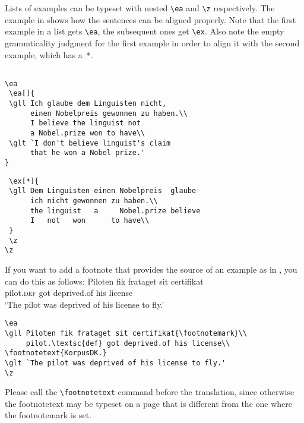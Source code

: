 Lists of examples can be typeset with nested \verb+\ea+  and \verb+\z+  respectively. The example in
 shows how the sentences can be aligned properly. Note that the first example in a list gets \verb+\ea+, the subsequent ones get \verb+\ex+. Also note the empty grammticality judgment for the first example in order to align it with the second example, which has a~*.


\ea  \label{ex:showcases:list}
\z
\z  

\begin{verbatim}

\ea 
 \ea[]{
 \gll Ich glaube dem Linguisten nicht, 
      einen Nobelpreis gewonnen zu haben.\\
      I believe the linguist not 
      a Nobel.prize won to have\\
 \glt `I don't believe linguist's claim 
      that he won a Nobel prize.'
}
\end{verbatim}
\newpage
\begin{verbatim}
 \ex[*]{
 \gll Dem Linguisten einen Nobelpreis  glaube  
      ich nicht gewonnen zu haben.\\
      the linguist   a     Nobel.prize believe 
      I   not   won      to have\\
 }
 \z
\z
\end{verbatim}

If you want to add a footnote that provides the source of an example as in , you can do
this as follows:
\ea\label{ex:showcases:footnote}
\gll Piloten         fik frataget    sit certifikat\footnotemark\\
     pilot.\textsc{def} got deprived.of his license\\
\glt `The pilot was deprived of his license to fly.'
\z 
\begin{verbatim}
\ea
\gll Piloten fik frataget sit certifikat{\footnotemark}\\
     pilot.\textsc{def} got deprived.of his license\\
\footnotetext{KorpusDK.}
\glt `The pilot was deprived of his license to fly.'
\z 
\end{verbatim}
Please call the \verb+\footnotetext+ command before the translation, since otherwise the
footnotetext may be typeset on a page that is different from the one where the footnotemark is set.

